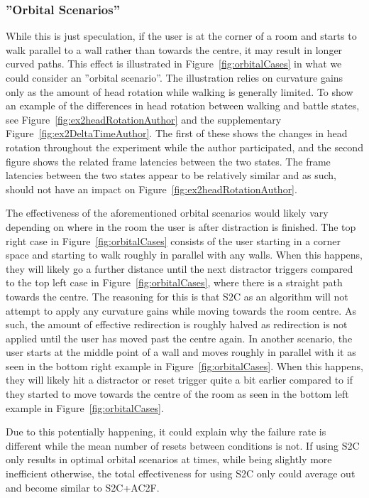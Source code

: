 \subsubsection{''Orbital Scenarios''}
While this is just speculation, if the user is at the corner of a room and starts to walk parallel to a wall rather than towards the centre, it may result in longer curved paths. This effect is illustrated in Figure~\ref{fig:orbitalCases} in what we could consider an ''orbital scenario''. The illustration relies on curvature gains only as the amount of head rotation while walking is generally limited. To show an example of the differences in head rotation between walking and battle states, see Figure~\ref{fig:ex2headRotationAuthor} and the supplementary Figure~\ref{fig:ex2DeltaTimeAuthor}. The first of these shows the changes in head rotation throughout the experiment while the author participated, and the second figure shows the related frame latencies between the two states. The frame latencies between the two states appear to be relatively similar and as such, should not have an impact on Figure~\ref{fig:ex2headRotationAuthor}.

The effectiveness of the aforementioned orbital scenarios would likely vary depending on where in the room the user is after distraction is finished. The top right case in Figure~\ref{fig:orbitalCases} consists of the user starting in a corner space and starting to walk roughly in parallel with any walls. When this happens, they will likely go a further distance until the next distractor triggers compared to the top left case in Figure~\ref{fig:orbitalCases}, where there is a straight path towards the centre. The reasoning for this is that S2C as an algorithm will not attempt to apply any curvature gains while moving towards the room centre. As such, the amount of effective redirection is roughly halved as redirection is not applied until the user has moved past the centre again. In another scenario, the user starts at the middle point of a wall and moves roughly in parallel with it as seen in the bottom right example in Figure~\ref{fig:orbitalCases}. When this happens, they will likely hit a distractor or reset trigger quite a bit earlier compared to if they started to move towards the centre of the room as seen in the bottom left example in Figure~\ref{fig:orbitalCases}.  

Due to this potentially happening, it could explain why the failure rate is different while the mean number of resets between conditions is not. If using S2C only results in optimal orbital scenarios at times, while being slightly more inefficient otherwise, the total effectiveness for using S2C only could average out and become similar to S2C+AC2F.

